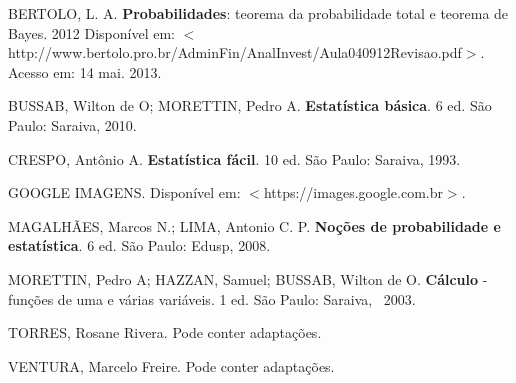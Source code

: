 \pagebreak

\begin{thebibliography}{}

BERTOLO, L. A.
\textbf{Probabilidades}: teorema da probabilidade total e teorema de Bayes.
2012
Disponível em: $<$http://www.bertolo.pro.br/AdminFin/AnalInvest/Aula040912Revisao.pdf$>$.
Acesso em: 14 mai. 2013.

BUSSAB, Wilton de O; MORETTIN, Pedro A.
\textbf{Estatística básica}.
6 ed.
São Paulo:
Saraiva,
2010.

CRESPO, Antônio A.
\textbf{Estatística fácil}.
10 ed.
São Paulo:
Saraiva,
1993.

GOOGLE IMAGENS.
Disponível em: $<$https://images.google.com.br$>$.

MAGALHÃES, Marcos N.; LIMA, Antonio C. P.
\textbf{Noções de probabilidade e estatística}.
6 ed.
São Paulo:
Edusp,
2008.

MORETTIN, Pedro A; HAZZAN, Samuel; BUSSAB, Wilton de O.
\textbf{Cálculo} - funções de uma e várias variáveis.
1 ed.
São Paulo:
Saraiva, \
2003.

TORRES, Rosane Rivera.
Pode conter adaptações.

VENTURA, Marcelo Freire.
Pode conter adaptações.

\end{thebibliography}